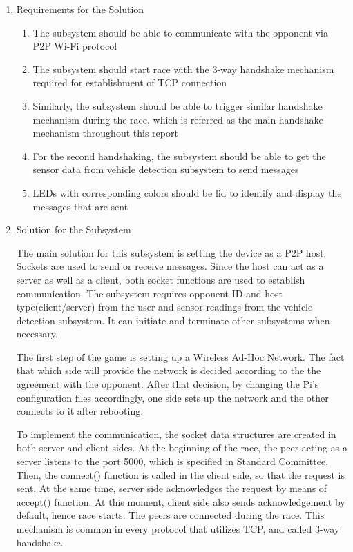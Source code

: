 \documentclass[a4paper,12pt]{article}
\begin{document}
\begin{enumerate}
	\item {Requirements for the Solution}
	
	\begin{enumerate}
		\item The subsystem should be able to communicate with the opponent via P2P Wi-Fi protocol
		\item The subsystem should start race with the 3-way handshake mechanism required for establishment of TCP connection
		\item Similarly, the subsystem should be able to trigger similar handshake mechanism during the race, which is referred as the main handshake mechanism throughout this report
		\item For the second handshaking, the subsystem should be able to get the sensor data from vehicle detection subsystem to send messages
		\item LEDs with corresponding colors should be lid to identify and display the messages that are sent
		
	\end{enumerate}
	
	\item {Solution for the Subsystem}
	
	The main solution for this subsystem is setting the device as a P2P host. Sockets are used to send or receive messages.  Since the host can act as a server as well as a client, both socket functions are used to establish communication. The subsystem requires opponent ID and host type(client/server) from the user and sensor readings from the vehicle detection subsystem. It can initiate and terminate other subsystems when necessary.
	
	The first step of the game is setting up a Wireless Ad-Hoc Network. The fact that which side will provide the network is decided according to the the agreement with the opponent. After that decision, by changing the Pi's configuration files accordingly, one side sets up the network and the other connects to it after rebooting.
	
	To implement the communication, the socket data structures are created in both server and client sides. At the beginning of the race, the peer acting as a server listens to the port 5000, which is specified in Standard Committee. Then, the connect() function is called in the client side, so that the request is sent. At the same time, server side acknowledges the request by means of accept() function. At this moment, client side also sends acknowledgement by default, hence race starts. The peers are connected during the race. This mechanism is common in every protocol that utilizes TCP, and called 3-way handshake.
	

\end{enumerate}
\end{document}

